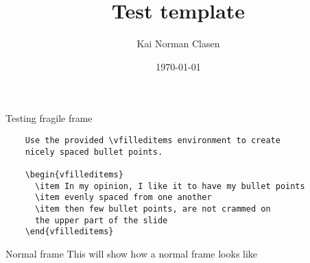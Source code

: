 \documentclass[aspectratio=169]{beamer}
\title[short title]{Test template}
\author{Kai Norman Clasen}
\institute{Testing}
\date{\today}
\begin{document}
\maketitle

\begin{frame}[fragile]{Testing fragile frame}
  \begin{verbatim}
    Use the provided \vfilleditems environment to create 
    nicely spaced bullet points.

    \begin{vfilleditems}
      \item In my opinion, I like it to have my bullet points
      \item evenly spaced from one another
      \item then few bullet points, are not crammed on 
      the upper part of the slide
    \end{vfilleditems}
    \end{verbatim}
\end{frame}

\begin{frame}{Normal frame}
  This will show how a normal frame looks like
\end{frame}
\end{document}
